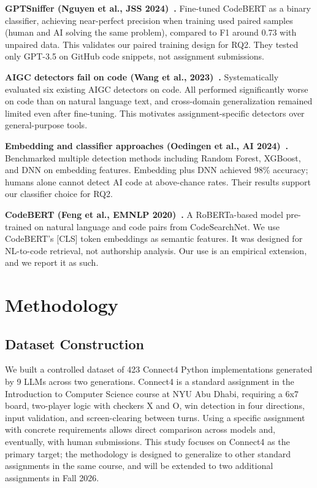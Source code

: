 \documentclass[sigconf]{acmart}
\begin{document}
\textbf{GPTSniffer (Nguyen et al., JSS 2024)~\cite{nguyen2024snippet}.} Fine-tuned CodeBERT as a binary classifier, achieving near-perfect precision when training used paired samples (human and AI solving the same problem), compared to F1 around 0.73 with unpaired data. This validates our paired training design for RQ2. They tested only GPT-3.5 on GitHub code snippets, not assignment submissions.

\textbf{AIGC detectors fail on code (Wang et al., 2023)~\cite{wang2023evaluating}.} Systematically evaluated six existing AIGC detectors on code. All performed significantly worse on code than on natural language text, and cross-domain generalization remained limited even after fine-tuning. This motivates assignment-specific detectors over general-purpose tools.

\textbf{Embedding and classifier approaches (Oedingen et al., AI 2024)~\cite{oedingen2024chatgpt}.} Benchmarked multiple detection methods including Random Forest, XGBoost, and DNN on embedding features. Embedding plus DNN achieved 98\% accuracy; humans alone cannot detect AI code at above-chance rates. Their results support our classifier choice for RQ2.

\textbf{CodeBERT (Feng et al., EMNLP 2020)~\cite{feng2020codebert}.} A RoBERTa-based model pre-trained on natural language and code pairs from CodeSearchNet. We use CodeBERT's [CLS] token embeddings as semantic features. It was designed for NL-to-code retrieval, not authorship analysis. Our use is an empirical extension, and we report it as such.

\section{Methodology}

\subsection{Dataset Construction}

We built a controlled dataset of 423 Connect4 Python implementations generated by 9 LLMs across two generations. Connect4 is a standard assignment in the Introduction to Computer Science course at NYU Abu Dhabi, requiring a 6x7 board, two-player logic with checkers X and O, win detection in four directions, input validation, and screen-clearing between turns. Using a specific assignment with concrete requirements allows direct comparison across models and, eventually, with human submissions. This study focuses on Connect4 as the primary target; the methodology is designed to generalize to other standard assignments in the same course, and will be extended to two additional assignments in Fall 2026.
\end{document}
